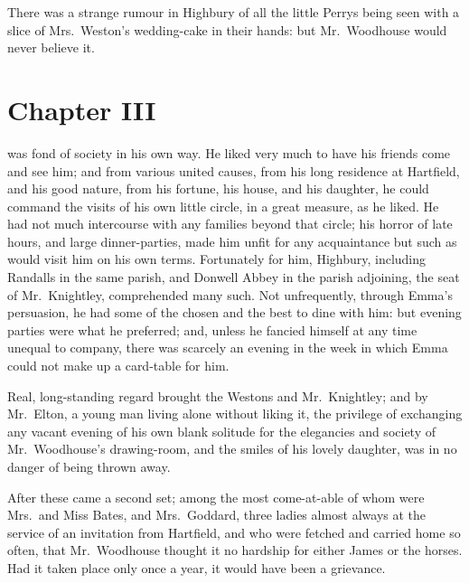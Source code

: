 There was a strange rumour in Highbury of all the little Perrys
being seen with a slice of Mrs.\ Weston's wedding-cake in their
hands: but Mr.\ Woodhouse would never believe it.



\chapter{Chapter III}


 was fond of society in his own way.  He liked very much
to have his friends come and see him; and from various united causes,
from his long residence at Hartfield, and his good nature,
from his fortune, his house, and his daughter, he could command the
visits of his own little circle, in a great measure, as he liked.
He had not much intercourse with any families beyond that circle;
his horror of late hours, and large dinner-parties, made him unfit
for any acquaintance but such as would visit him on his own terms.
Fortunately for him, Highbury, including Randalls in the same parish,
and Donwell Abbey in the parish adjoining, the seat of Mr.\ Knightley,
comprehended many such.  Not unfrequently, through Emma's persuasion,
he had some of the chosen and the best to dine with him: but evening
parties were what he preferred; and, unless he fancied himself at any
time unequal to company, there was scarcely an evening in the week
in which Emma could not make up a card-table for him.

Real, long-standing regard brought the Westons and Mr.\ Knightley;
and by Mr.\ Elton, a young man living alone without liking it,
the privilege of exchanging any vacant evening of his own blank solitude
for the elegancies and society of Mr.\ Woodhouse's drawing-room,
and the smiles of his lovely daughter, was in no danger of being
thrown away.

After these came a second set; among the most come-at-able
of whom were Mrs.\ and Miss Bates, and Mrs.\ Goddard, three ladies
almost always at the service of an invitation from Hartfield,
and who were fetched and carried home so often, that Mr.\ Woodhouse
thought it no hardship for either James or the horses.  Had it
taken place only once a year, it would have been a grievance.

